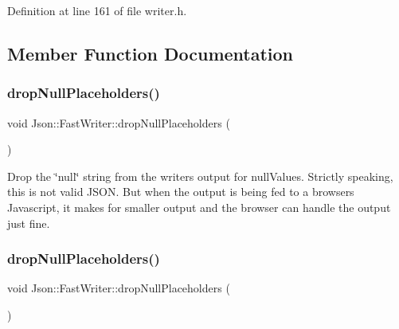 Definition at line 161 of file writer.\+h.



\subsection{Member Function Documentation}
\hypertarget{class_json_1_1_fast_writer_a6e93d8dce951e408517311026a065b40}{}\label{class_json_1_1_fast_writer_a6e93d8dce951e408517311026a065b40} 
\subsubsection{\texorpdfstring{drop\+Null\+Placeholders()}{dropNullPlaceholders()}\hspace{0.1cm}{\footnotesize\ttfamily [1/2]}}
{\footnotesize\ttfamily void Json\+::\+Fast\+Writer\+::drop\+Null\+Placeholders (\begin{DoxyParamCaption}{ }\end{DoxyParamCaption})}



Drop the \char`\"{}null\char`\"{} string from the writer\textquotesingle{}s output for null\+Values. Strictly speaking, this is not valid J\+S\+ON. But when the output is being fed to a browser\textquotesingle{}s Javascript, it makes for smaller output and the browser can handle the output just fine. 

\hypertarget{class_json_1_1_fast_writer_a6e93d8dce951e408517311026a065b40}{}\label{class_json_1_1_fast_writer_a6e93d8dce951e408517311026a065b40} 
\subsubsection{\texorpdfstring{drop\+Null\+Placeholders()}{dropNullPlaceholders()}\hspace{0.1cm}{\footnotesize\ttfamily [2/2]}}
{\footnotesize\ttfamily void Json\+::\+Fast\+Writer\+::drop\+Null\+Placeholders (\begin{DoxyParamCaption}{ }\end{DoxyParamCaption})}



